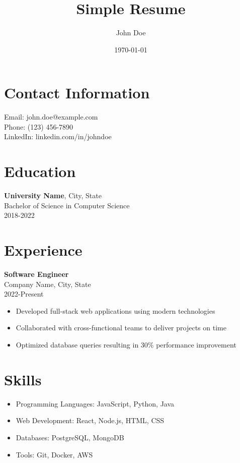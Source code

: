 \documentclass{article}
\title{Simple Resume}
\author{John Doe}
\date{\today}
\begin{document}
\maketitle

\section{Contact Information}
Email: john.doe@example.com \\
Phone: (123) 456-7890 \\
LinkedIn: linkedin.com/in/johndoe

\section{Education}
\textbf{University Name}, City, State \\
Bachelor of Science in Computer Science \\
2018-2022

\section{Experience}
\textbf{Software Engineer} \\
Company Name, City, State \\
2022-Present
\begin{itemize}
  \item Developed full-stack web applications using modern technologies
  \item Collaborated with cross-functional teams to deliver projects on time
  \item Optimized database queries resulting in 30\% performance improvement
\end{itemize}

\section{Skills}
\begin{itemize}
  \item Programming Languages: JavaScript, Python, Java
  \item Web Development: React, Node.js, HTML, CSS
  \item Databases: PostgreSQL, MongoDB
  \item Tools: Git, Docker, AWS
\end{itemize}
\end{document}
